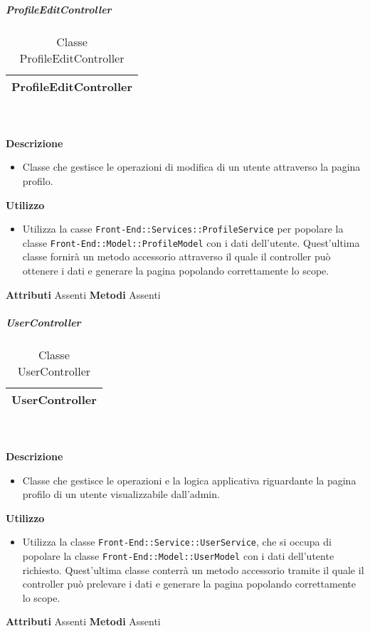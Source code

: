 			\subparagraph{ProfileEditController} 
\begin{table}[ht]
\begin{center}
\bgroup
	\setlength{\arrayrulewidth}{0.6mm}
	\def\arraystretch{1}
		\begin{tabular}{ | p{12cm} | }
				\hline  
					\centerline{\textbf{ProfileEditController}}
		\\ \hline 
				\hline
				\hline
		
		\end{tabular}
\egroup
\caption{Classe ProfileEditController}
\end{center}
\end{table} \textbf{\\ \\ Descrizione}
\begin{itemize}
\item[] Classe che gestisce le operazioni di modifica di un utente attraverso la pagina profilo.
\end{itemize} 
\textbf{Utilizzo}
\begin{itemize}
\item[] Utilizza la casse \texttt{Front-End::Services::ProfileService} per popolare la classe \texttt{Front-End::Model::ProfileModel} con i dati dell'utente. Quest'ultima classe fornirà un metodo accessorio attraverso il quale il controller può ottenere i dati e generare la pagina popolando correttamente lo scope.
\end{itemize}
\textbf{Attributi}
Assenti
\textbf{Metodi}
Assenti

			\subparagraph{UserController} 
\begin{table}[ht]
\begin{center}
\bgroup
	\setlength{\arrayrulewidth}{0.6mm}
	\def\arraystretch{1}
		\begin{tabular}{ | p{12cm} | }
				\hline  
					\centerline{\textbf{UserController}}
		\\ \hline 
				\hline
				\hline
		
		\end{tabular}
\egroup
\caption{Classe UserController}
\end{center}
\end{table} \textbf{\\ \\ Descrizione}
\begin{itemize}
\item[] Classe che gestisce le operazioni e la logica applicativa riguardante la pagina profilo di un utente visualizzabile dall'admin.
\end{itemize} 
\textbf{Utilizzo}
\begin{itemize}
\item[] Utilizza la classe \texttt{Front-End::Service::UserService}, che si occupa di popolare la classe \texttt{Front-End::Model::UserModel} con i dati dell'utente richiesto. Quest'ultima classe conterrà un metodo accessorio tramite il quale il controller può prelevare i dati e generare la pagina popolando correttamente lo scope.
\end{itemize}
\textbf{Attributi}
Assenti
\textbf{Metodi}
Assenti


